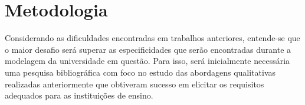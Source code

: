 
\section{Metodologia } %



    Considerando as dificuldades encontradas em trabalhos anteriores, entende-se que o maior desafio será superar as especificidades que serão encontradas durante a modelagem da universidade em questão. Para isso, será inicialmente necessária uma pesquisa bibliográfica com foco no estudo das abordagens qualitativas realizadas anteriormente que obtiveram sucesso em elicitar os requisitos adequados para as instituições de ensino.

